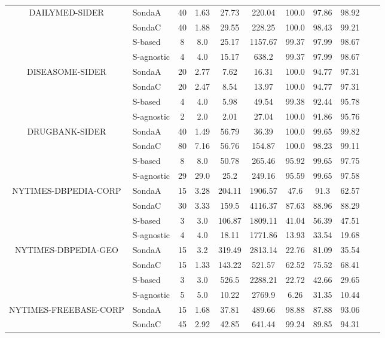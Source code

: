 \begin{center}
\begin{table}[h]
\begin{tabular}{|c|l|c|c|c|c|c|c|c|c|c|}
\multirow{4}{*}{DAILYMED-SIDER}  & SondaA  & 40 & 1.63   & 27.73  & 220.04 & 100.0 & 97.86 & 98.92  \\
 & SondaC  & 40 & 1.88   & 29.55  & 228.25 & 100.0 & 98.43 & 99.21  \\
 & S-based  & 8 & 8.0   & 25.17  & 1157.67 & 99.37 & 97.99 & 98.67  \\
 & S-agnostic  & 4 & 4.0   & 15.17  & 638.2 & 99.37 & 97.99 & 98.67  \\ \hline
\multirow{4}{*}{DISEASOME-SIDER}  & SondaA  & 20 & 2.77   & 7.62  & 16.31 & 100.0 & 94.77 & 97.31  \\
 & SondaC  & 20 & 2.47   & 8.54  & 13.97 & 100.0 & 94.77 & 97.31  \\
 & S-based  & 4 & 4.0   & 5.98  & 49.54 & 99.38 & 92.44 & 95.78  \\
 & S-agnostic  & 2 & 2.0   & 2.01  & 27.04 & 100.0 & 91.86 & 95.76  \\ \hline
\multirow{4}{*}{DRUGBANK-SIDER}  & SondaA  & 40 & 1.49   & 56.79  & 36.39 & 100.0 & 99.65 & 99.82  \\
 & SondaC  & 80 & 7.16   & 56.76  & 154.87 & 100.0 & 98.23 & 99.11  \\
 & S-based  & 8 & 8.0   & 50.78  & 265.46 & 95.92 & 99.65 & 97.75  \\
 & S-agnostic  & 29 & 29.0   & 25.2  & 249.16 & 95.59 & 99.65 & 97.58  \\ \hline
\multirow{4}{*}{NYTIMES-DBPEDIA-CORP}  & SondaA  & 15 & 3.28   & 204.11  & 1906.57 & 47.6 & 91.3 & 62.57  \\
 & SondaC  & 30 & 3.33   & 159.5  & 4116.37 & 87.63 & 88.96 & 88.29  \\
 & S-based  & 3 & 3.0   & 106.87  & 1809.11 & 41.04 & 56.39 & 47.51  \\
 & S-agnostic  & 4 & 4.0   & 18.11  & 1771.86 & 13.93 & 33.54 & 19.68  \\ \hline
\multirow{4}{*}{NYTIMES-DBPEDIA-GEO}  & SondaA  & 15 & 3.2   & 319.49  & 2813.14 & 22.76 & 81.09 & 35.54  \\
 & SondaC  & 15 & 1.33   & 143.22  & 521.57 & 62.52 & 75.52 & 68.41  \\
 & S-based  & 3 & 3.0   & 526.5  & 2288.21 & 22.72 & 42.66 & 29.65  \\
 & S-agnostic  & 5 & 5.0   & 10.22  & 2769.9 & 6.26 & 31.35 & 10.44  \\ \hline
\multirow{4}{*}{NYTIMES-FREEBASE-CORP}  & SondaA  & 15 & 1.68   & 37.81  & 489.66 & 98.88 & 87.88 & 93.06  \\
 & SondaC  & 45 & 2.92   & 42.85  & 641.44 & 99.24 & 89.85 & 94.31  \\

\end{tabular}
\end{table}
\end{center}
